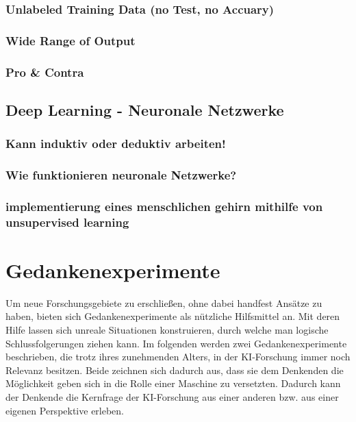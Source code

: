 \documentclass[12pt,german,ngerman]{report}
\begin{document}
        \subsection{Unlabeled Training Data (no Test, no Accuary)}
        \subsection{Wide Range of Output}
        \subsection{Pro \& Contra}

    \section{Deep Learning - Neuronale Netzwerke}
        \subsection{Kann induktiv oder deduktiv arbeiten!}
        \subsection{Wie funktionieren neuronale Netzwerke?}
        \subsection{implementierung eines menschlichen gehirn mithilfe von unsupervised learning}

\chapter{Gedankenexperimente}
    Um neue Forschungsgebiete zu erschließen, ohne dabei handfest Ansätze zu haben,
    bieten sich Gedankenexperimente als nützliche Hilfsmittel an.
    Mit deren Hilfe lassen sich unreale Situationen konstruieren, durch welche man logische Schlussfolgerungen ziehen kann.
    Im folgenden werden zwei Gedankenexperimente beschrieben, die trotz ihres zunehmenden Alters, in der KI-Forschung
    immer noch Relevanz besitzen. Beide zeichnen sich dadurch aus, dass sie dem Denkenden die Möglichkeit geben sich in die
    Rolle einer Maschine zu versetzten. Dadurch kann der Denkende die Kernfrage der KI-Forschung aus einer anderen
    bzw. aus einer eigenen Perspektive erleben. 
\end{document}
